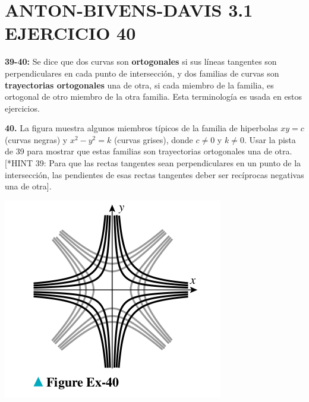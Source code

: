 \chapter*{ ANTON-BIVENS-DAVIS 3.1 EJERCICIO 40}

\textbf{39-40:} Se dice que dos curvas son \textbf{ortogonales} si sus líneas tangentes son perpendiculares en cada punto de intersección, y dos familias de curvas son \textbf{trayectorias ortogonales} una de otra, si cada miembro de la familia, es ortogonal de otro miembro de la otra familia. Esta terminología es usada en estos ejercicios. \newline

\textbf{40.} La figura muestra algunos miembros típicos de la familia de hiperbolas $xy = c$ (curvas negras) y $x^{2} - y^{2} = k$ (curvas grises), donde $ c \neq 0$ y $ k \neq 0$. Usar la pista de 39 para mostrar que estas familias son trayectorias ortogonales una de otra. [*HINT 39: Para que las rectas tangentes sean perpendiculares en un punto de la intersección, las pendientes de esas rectas tangentes deber ser recíprocas negativas una de otra]. \\
\newline
\begin{center}
    \includegraphics[height = 0.25\textheight]{recursos/Grafo40.png}\par
\end{center}

